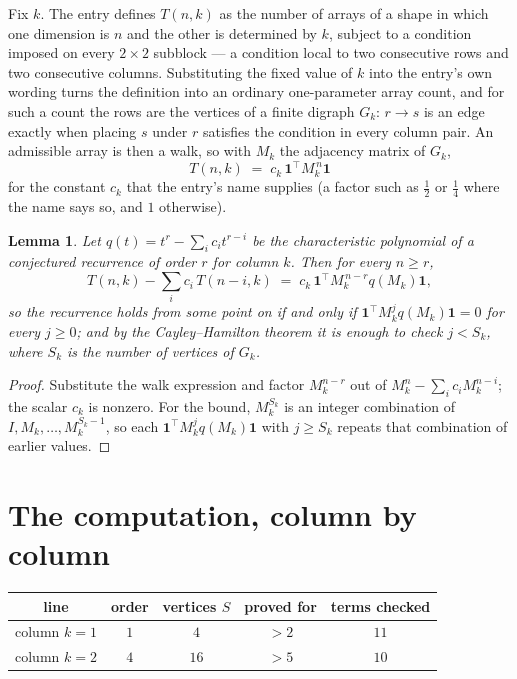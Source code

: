 \documentclass[11pt,a4paper]{article}
\theoremstyle{plain}
\newtheorem{lemma}[theorem]{Lemma}
\theoremstyle{definition}
\begin{document}
Fix $k$. The entry defines $T(n,k)$ as the number of arrays of a shape in which one dimension
is $n$ and the other is determined by $k$, subject to a condition imposed on every
$2\times2$ subblock --- a condition local to two consecutive rows and two consecutive columns.
Substituting the fixed value of $k$ into the entry's own wording turns the definition into an
ordinary one-parameter array count, and for such a count the rows are the vertices of a finite
digraph $G_k$: $r\to s$ is an edge exactly when placing $s$ under $r$ satisfies the condition
in every column pair. An admissible array is then a walk, so with $M_k$ the adjacency matrix
of $G_k$,
\[
T(n,k)\;=\;c_k\,\mathbf{1}^{\!\top}M_k^{\,n}\mathbf{1}
\]
for the constant $c_k$ that the entry's name supplies (a factor such as $\tfrac12$ or
$\tfrac14$ where the name says so, and $1$ otherwise).

\begin{lemma}\label{lem:crit}
Let $q(t)=t^{r}-\sum_i c_it^{r-i}$ be the characteristic polynomial of a conjectured
recurrence of order $r$ for column $k$. Then for every $n\ge r$,
\[
T(n,k)-\sum_i c_i\,T(n-i,k)\;=\;c_k\,\mathbf{1}^{\!\top}M_k^{\,n-r}q(M_k)\mathbf{1},
\]
so the recurrence holds from some point on if and only if
$\mathbf{1}^{\!\top}M_k^{j}q(M_k)\mathbf{1}=0$ for every $j\ge0$; and by the
Cayley--Hamilton theorem it is enough to check $j<S_k$, where $S_k$ is the number of vertices
of $G_k$.
\end{lemma}

\begin{proof}
Substitute the walk expression and factor $M_k^{n-r}$ out of $M_k^{n}-\sum_ic_iM_k^{n-i}$;
the scalar $c_k$ is nonzero. For the bound, $M_k^{S_k}$ is an integer combination of
$I,M_k,\dots,M_k^{S_k-1}$, so each $\mathbf{1}^{\!\top}M_k^{j}q(M_k)\mathbf{1}$ with
$j\ge S_k$ repeats that combination of earlier values.
\end{proof}

\section{The computation, column by column}

\begin{center}
\begin{tabular}{ccccc}
line & order & vertices $S$ & proved for & terms checked \\ \hline
column $k$$=1$ & $1$ & $4$ & $>2$ & $11$ \\
column $k$$=2$ & $4$ & $16$ & $>5$ & $10$ \\
\end{tabular}
\end{center}
\end{document}
